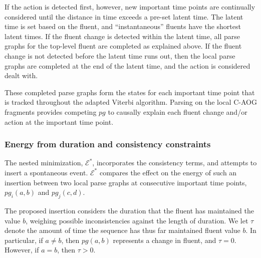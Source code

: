 \documentclass[10pt,journal,letterpaper,compsoc]{IEEEtran}
\begin{document}
If the action is detected first, however, new important time points are continually considered until the distance in time exceeds a pre-set latent time.  The latent time is set based on the fluent, and ``instantaneous'' fluents have the shortest latent times.  If the fluent change is detected within the latent time, all parse graphs for the top-level fluent are completed as explained above.  If the fluent change is not detected before the latent time runs out, then the local parse graphs are completed at the end of the latent time, and the action is considered dealt with.  

These completed parse graphs form the states for each important time point that is tracked throughout the adapted Viterbi algorithm.  Parsing on the local C-AOG fragments provides competing $pg$ to causally explain each fluent change and/or action at the important time point.  %





\subsubsection{Energy from duration and consistency constraints}
\label{sec:e_star}

The nested minimization, $\mathcal{E}^{*}$, incorporates the consistency terms, and attempts to insert a spontaneous event. $\mathcal{E}^{*}$ compares the effect on the energy of such an insertion between two local parse graphs at consecutive important time points, $pg_i(a,b)$ and $pg_j(c,d)$.  

The proposed insertion considers the duration that the fluent has maintained the value $b$, weighing possible inconsistencies against the length of duration.  We let $\tau$ denote the amount of time the sequence has thus far maintained fluent value $b$.  In particular, if $a \ne b$, then $pg(a,b)$ represents a change in fluent, and $\tau  = 0$.  However, if $a = b$, then $\tau  > 0$.

\end{document}
